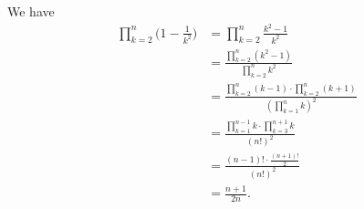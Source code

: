 We have
\begin{align*}
    \prod_{k=2}^n\biggl(1-\frac{1}{k^2}\biggr) &= \prod_{k=2}^n\frac{k^2-1}{k^2} \\[3pt]
    &= \frac{\prod_{k=2}^n(k^2-1)}{\prod_{k=2}^nk^2} \\[3pt]
    &= \frac{\prod_{k=2}^n(k-1) \cdot \prod_{k=2}^n(k+1)}{\left(\prod_{k=1}^nk\right)^2} \\[3pt]
    &= \frac{\prod_{k=1}^{n-1}k \cdot \prod_{k=3}^{n+1}k}{(n!)^2} \\
    &= \frac{(n-1)! \cdot \frac{(n+1)!}{2}}{(n!)^2} \\
    &= \frac{n+1}{2n}.
\end{align*}
